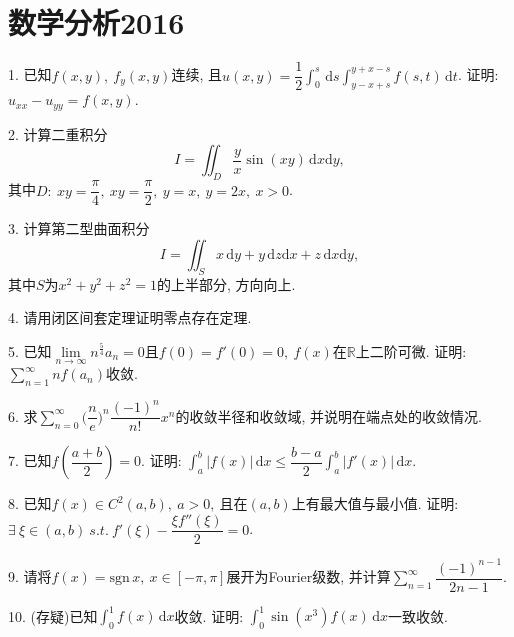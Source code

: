 \documentclass[12pt, a4paper, twoside]{ctexart}%
\newcommand{\rmd}{\mathrm{d}} %
\begin{document}
	\section{数学分析2016}
	1. 已知$f(x,y),\ f_y(x,y)$连续, 且$u(x,y)=\dfrac{1}{2}\int_0^s\,\rmd s\int_{y-x+s}^{y+x-s}f(s,t)\,\rmd t$. 证明: $u_{xx}-u_{yy}=f(x,y)$.\par 
	2. 计算二重积分\[I=\iint_D\dfrac{y}{x}\sin(xy)\,\rmd x\rmd y,\]其中$D:\ xy=\dfrac{\pi}{4},\ xy=\dfrac{\pi}{2},\ y=x,\ y=2x,\ x>0$.\par 
	3. 计算第二型曲面积分\[I=\iint_S x\,\rmd y+y\,\rmd z\rmd x+z\,\rmd x\rmd y,\]其中$S$为$x^2+y^2+z^2=1$的上半部分, 方向向上.\par
	4. 请用闭区间套定理证明零点存在定理. \par
	5. 已知$\lim\limits_{n\rightarrow\infty}n^\frac{5}{4}a_n=0\mbox{且}f(0)=f'(0)=0,\ f(x)\mbox{在}\mathbb{R}$上二阶可微. 证明: $\sum\limits_{n=1}^\infty nf(a_n)$收敛.\par
	6. 求$\sum\limits_{n=0}^\infty\Big(\dfrac{n}{e}\Big)^n\dfrac{(-1)^n}{n!}x^n$的收敛半径和收敛域, 并说明在端点处的收敛情况.\par
	7. 已知$f(\dfrac{a+b}{2})=0$. 证明: $\int_a^b|f(x)|\,\rmd x\leq \dfrac{b-a}{2}\int_a^b|f'(x)|\,\rmd x$.\par 
	8. 已知$f(x)\in C^2(a,b),\ a>0,\ \mbox{且在}(a,b)$上有最大值与最小值. 证明: $\exists\ \xi\in(a,b)\ s.t.\ f'(\xi)-\dfrac{\xi f''(\xi)}{2}=0$.\par 
	9. 请将$f(x)=\mathrm{sgn}\,x,\ x\in[-\pi,\pi]$展开为Fourier级数, 并计算$\sum\limits_{n=1}^\infty\dfrac{(-1)^{n-1}}{2n-1}$.\par 
	10. (存疑)已知$\int_0^1 f(x)\,\rmd x$收敛. 证明: $\int_0^1\sin(x^3)f(x)\, \rmd x$一致收敛.\par
	\clearpage
\end{document}
